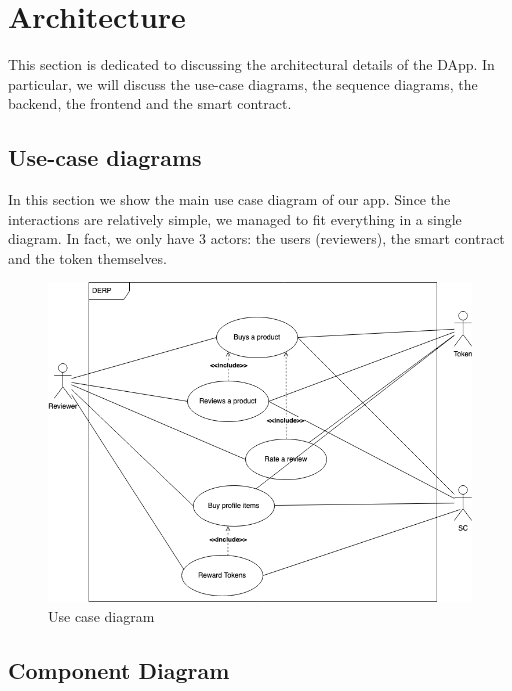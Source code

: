 \documentclass[12pt,a4paper,oneside]{article}
\theoremstyle{definition}
\begin{document}
\newpage
\section{Architecture}

This section is dedicated to discussing the architectural details of the DApp. In particular, we will discuss the use-case diagrams, the sequence diagrams, the backend, the frontend and the smart contract.

\subsection{Use-case diagrams}


In this section we show the main use case diagram of our app. Since the interactions are relatively simple, we managed to fit everything in a single diagram. In fact, we only have 3 actors: the users (reviewers), the smart contract and the token themselves.

\begin{figure}[ht]
	\centering
	\includegraphics[scale=0.5]{figures/uc_drawio.png}
	\caption{Use case diagram}
	\label{fig:use_case}
\end{figure}


\subsection{Component Diagram}
\end{document}
